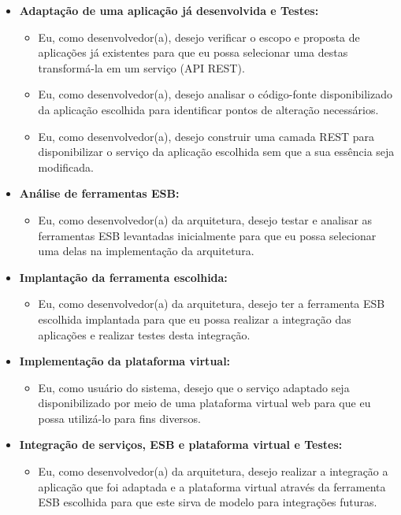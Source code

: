 \begin{itemize}
\item \textbf{Adaptação de uma aplicação já desenvolvida e Testes:} 

\begin{itemize}
\item Eu, como desenvolvedor(a), desejo verificar o escopo e proposta de aplicações já existentes para que eu possa selecionar uma destas transformá-la em um serviço (API REST).
\item Eu, como desenvolvedor(a), desejo analisar o código-fonte disponibilizado da aplicação escolhida para identificar pontos de alteração necessários.
\item Eu, como desenvolvedor(a), desejo construir uma camada REST para disponibilizar o serviço da aplicação escolhida sem  que a sua essência seja modificada.
\end{itemize}

\item \textbf{Análise de ferramentas ESB:} 
\begin{itemize}
\item Eu, como desenvolvedor(a) da arquitetura, desejo testar e analisar as ferramentas ESB levantadas inicialmente para que eu possa selecionar uma delas na implementação da arquitetura.
\end{itemize}

\item \textbf{Implantação da ferramenta escolhida:} 
\begin{itemize}
\item Eu, como desenvolvedor(a) da arquitetura, desejo ter a ferramenta ESB escolhida implantada para que eu possa realizar a integração das aplicações e realizar testes desta integração.
\end{itemize}

\item \textbf{Implementação da plataforma virtual:} 
\begin{itemize}
\item Eu, como usuário do sistema, desejo que o serviço adaptado seja disponibilizado por meio de uma plataforma virtual web para que eu possa utilizá-lo para fins diversos.
\end{itemize}

\item \textbf{Integração de serviços, ESB e plataforma virtual e Testes:} 
\begin{itemize}
\item Eu, como desenvolvedor(a) da arquitetura, desejo realizar a integração a aplicação que foi adaptada e a plataforma virtual através da ferramenta ESB escolhida para que este sirva de modelo para integrações futuras.
\end{itemize}


\end{itemize}

